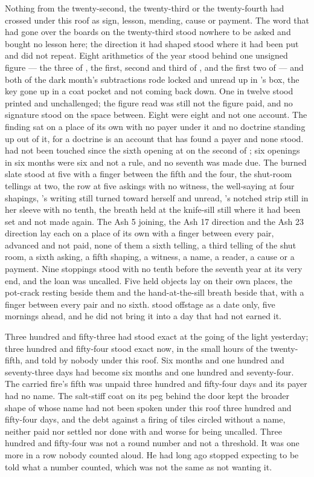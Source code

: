 Nothing from the twenty-second, the twenty-third or the twenty-fourth had crossed under this roof as sign, lesson, mending, cause or payment. The word that had gone over the boards on the twenty-third stood nowhere to be asked and bought no lesson here; the direction it had shaped stood where it had been put and did not repeat. Eight arithmetics of the year stood behind one unsigned figure --- the three of , the first, second and third of , and the first two of  --- and both of the dark month's subtractions rode locked and unread up  in 's box, the key gone up in a coat pocket and not coming back down. One in twelve stood printed and unchallenged; the figure read was still not the figure paid, and no signature stood on the space between. Eight were eight and not one account. The finding sat on a place of its own with no payer under it and no doctrine standing up out of it, for a doctrine is an account that has found a payer and none stood.  had not been touched since the sixth opening at  on the second of ; six openings in six months were six and not a rule, and no seventh was made due. The burned slate stood at five with a finger between the fifth and the four, the shut-room tellings at two, the row at five askings with no witness, the well-saying at four shapings, 's writing still turned toward herself and unread, 's notched strip still in her sleeve with no tenth, the breath held at the knife-sill still where it had been set and not made again. The Ash 5 joining, the Ash 17 direction and the Ash 23 direction lay each on a place of its own with a finger between every pair, advanced and not paid, none of them a sixth telling, a third telling of the shut room, a sixth asking, a fifth shaping, a witness, a name, a reader, a cause or a payment. Nine stoppings stood with no tenth before the seventh year at its very end, and the loan was uncalled. Five held objects lay on their own places, the pot-crack resting beside them and the hand-at-the-sill breath beside that, with a finger between every pair and no sixth.  stood offstage as a date only, five mornings ahead, and he did not bring it into a day that had not earned it.

Three hundred and fifty-three had stood exact at the going of the light yesterday; three hundred and fifty-four stood exact now, in the small hours of the twenty-fifth, and told by nobody under this roof. Six months and one hundred and seventy-three days had become six months and one hundred and seventy-four. The carried fire's fifth was unpaid three hundred and fifty-four days and its payer had no name. The salt-stiff coat on its peg behind the door kept the broader shape of  whose name had not been spoken under this roof three hundred and fifty-four days, and the debt against a firing of tiles circled without a name, neither paid nor settled nor done with and worse for being uncalled. Three hundred and fifty-four was not a round number and not a threshold. It was one more in a row nobody counted aloud. He had long ago stopped expecting to be told what a number counted, which was not the same as not wanting it.

